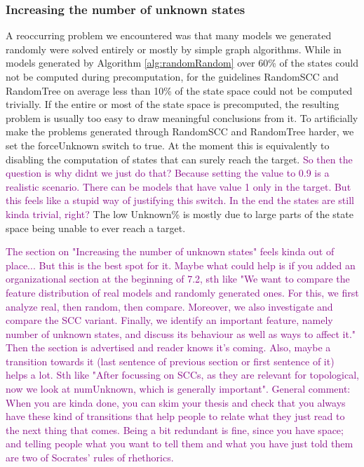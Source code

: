 \subsubsection*{Increasing the number of unknown states}
A reoccurring problem we encountered was that many models we generated randomly were solved entirely or mostly by simple graph algorithms.
While in models generated by Algorithm \ref{alg:randomRandom} over 60\% of the states could not be computed during precomputation, 
for the guidelines RandomSCC and RandomTree on average less than 10\% of the state space could not be computed trivially.
If the entire or most of the state space is precomputed, the resulting problem is usually too easy to draw meaningful conclusions from it.
To artificially make the problems generated through RandomSCC and RandomTree harder, we set the forceUnknown switch to true. 
At the moment this is equivalently to disabling the computation of 
states that can surely reach the target. \textcolor{purple}{So then the question is why didnt we just do that?
Because setting the value to 0.9 is a realistic scenario. There can be models that have value 1 only in the target. 
But this feels like a stupid way of justifying this switch. In the end the states are still kinda trivial, right?}
The low Unknown\% is mostly due to large parts of the state space being unable to ever reach a target.

\textcolor{purple}{The section on "Increasing the number of unknown states" feels kinda out of place... But this is the best spot for it.
Maybe what could help is if you added an organizational section at the beginning of 7.2, sth like "We want to compare the feature distribution of real models and randomly generated ones. For this, we first analyze real, then random, then compare. Moreover, we also investigate and compare the SCC variant. Finally, we identify an important feature, namely number of unknown states, and discuss its behaviour as well as ways to affect it."
Then the section is advertised and reader knows it's coming. Also, maybe a transition towards it (last sentence of previous section or first sentence of it) helps a lot. Sth like "After focussing on SCCs, as they are relevant for topological, now we look at numUnknown, which is generally important".
General comment: When you are kinda done, you can skim your thesis and check that you always have these kind of transitions that help people to relate what they just read to the next thing that comes. Being a bit redundant is fine, since you have space; and telling people what you want to tell them and what you have just told them are two of Socrates' rules of rhethorics.}


